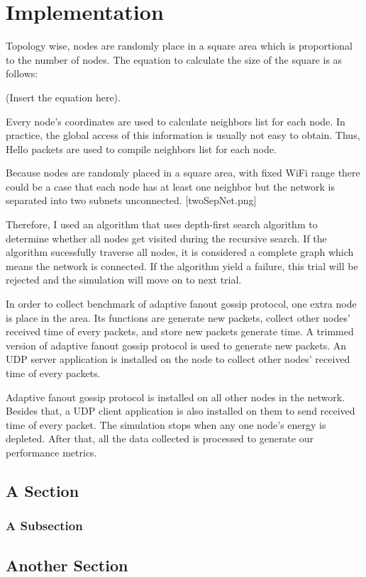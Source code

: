 \chapter{Implementation}



Topology wise, nodes are randomly place in a square area which is proportional to the number of nodes. The equation to calculate the size of the square is as follows:

(Insert the equation here).

Every node's coordinates are used to calculate neighbors list for each node. In practice, the global access of this information is usually not easy to obtain. Thus, Hello packets are used to compile neighbors list for each node.

Because nodes are randomly placed in a square area, with fixed WiFi range there could be a case that each node has at least one neighbor but the network is separated into two subnets unconnected. [twoSepNet.png]

Therefore, I used an algorithm that uses depth-first search algorithm to determine whether all nodes get visited during the recursive search. If the algorithm sucessfully traverse all nodes, it is considered a complete graph which means the network is connected. If the algorithm yield a failure, this trial will be rejected and the simulation will move on to next trial.

In order to collect benchmark of adaptive fanout gossip protocol, one extra node is place in the area. Its functions are generate new packets, collect other nodes' received time of every packets, and store new packets generate time. A trimmed version of adaptive fanout gossip protocol is used to generate new packets. An UDP server application is installed on the node to collect other nodes' received time of every packets.

Adaptive fanout gossip protocol is installed on all other nodes in the network. Besides that, a UDP client application is also installed on them to send received time of every packet. The simulation stops when any one node's energy is depleted. After that, all the data collected is processed to generate our performance metrics. 


\section{A Section}



\subsection{A Subsection}



\section{Another Section}

